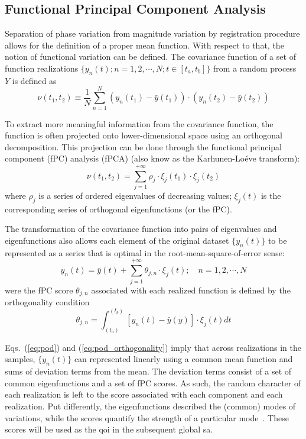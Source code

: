 \subsection{Functional Principal Component Analysis}\label{sub:sa_fpca}

Separation of phase variation from magnitude variation by registration procedure allows for the definition of a proper mean function.
With respect to that, the notion of functional variation can be defined.
The covariance function of a set of function realizations $\{y_n(t);n = 1, 2, \cdots, N; t \in [t_a,t_b]\}$ from a random process $Y$ is defined as
\begin{equation}
	\nu (t_1, t_2) \equiv \frac{1}{N} \sum_{n=1}^{N} (y_n(t_1) - \bar{y}(t_1)) \cdot (y_n(t_2) - \bar{y}(t_2))
\label{eq:covariance_function}
\end{equation}

To extract more meaningful information from the covariance function, the function is often projected onto lower-dimensional space using an orthogonal decomposition.
This projection can be done through the functional principal component (fPC) analysis (fPCA) (also know as the Karhunen-Lo\'eve transform):
\begin{equation}
	\nu (t_1, t_2) = \sum_{j=1}^{+\infty} \rho_j \cdot \xi_j(t_1) \cdot \xi_j(t_2)
\label{eq:kl_transform}
\end{equation}
where $\rho_j$ is a series of ordered eigenvalues of decreasing values; 
$\xi_j(t)$ is the corresponding series of orthogonal eigenfunctions (or the fPC).

The transformation of the covariance function into pairs of eigenvalues and eigenfunctions also allows each element of the original dataset $\{y_n(t)\}$ to be represented as a series that is optimal in the root-mean-square-of-error sense:
\begin{equation}
  y_n(t) = \bar{y}(t) + \sum_{j=1}^{+\infty} \theta_{j,n} \cdot \xi_j (t); \quad n = 1, 2, \cdots, N
\label{eq:pod}
\end{equation}
were the fPC score $\theta_{j,n}$ associated with each realized function is defined by the orthogonality condition
\begin{equation}
  \theta_{j,n} = \int_(t_a)^(t_b) \left[y_n(t) - \bar{y}(y)\right] \cdot \xi_j (t) dt
\label{eq:pod_orthogonality}
\end{equation}

Eqs.~(\ref{eq:pod}) and (\ref{eq:pod_orthogonality}) imply that across realizations in the samples, 
$\{y_n(t)\}$ can represented linearly using a common mean function and sums of deviation terms from the mean.
The deviation terms consist of a set of common eigenfunctions and a set of fPC scores.
As such, the random character of each realization is left to the score associated with each component and each realization.
Put differently, the eigenfunctions described the (common) modes of variations, 
while the scores quantify the strength of a particular mode~\cite{Wang2012}.
These scores will be used as the \gls{qoi} in the subsequent global \gls{sa}. 